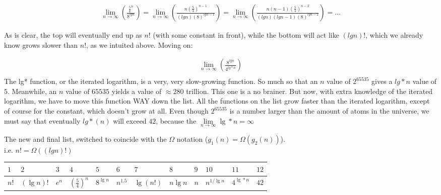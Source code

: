 \documentclass[12pt]{article}
\begin{document}
\begin{enumerate}
\begin{gather*}
	\lim\limits_{n\to\infty}\left(\frac{\frac{5}{4}^n}{8^{lgn}}\right) = \lim\limits_{n\to\infty}\left(\frac{n(\frac{5}{4})^{n-1}}{(lgn)(8)^{lgn-1}}\right) = \lim\limits_{n\to\infty}\left(\frac{n(n-1)(\frac{5}{4})^{n-2}}{(lgn)(lgn - 1)(8)^{lgn-2}}\right) = \dots
	\end{gather*}
	
	As is clear, the top will eventually end up as $n!$ (with some constant in front), while the bottom will act like $(lgn)!$, which we already know grows slower than $n!$, as we intuited above. Moving on:
	
	\begin{gather*}
		\lim\limits_{n\to\infty}\left(\frac{8^{lgn}}{4^{lg*n}}\right)\\
		\text{}
	\end{gather*}
The lg* function, or the iterated logarithm, is a very, very slow-growing function. So much so that an $n$ value of $2^{65535}$ gives a $lg*n$ value of $5$. Meanwhile, an $n$ value of $65535$ yields a value of $\approx 280$ trillion. This one is a no brainer. But now, with extra knowledge of the iterated logarithm, we have to move this function WAY down the list. All the functions on the list grow faster than the iterated logarithm, except of course for the constant, which doesn't grow at all. Even though $2^{65535}$ is a number larger than the amount of atoms in the universe, we must say that eventually $lg*(n)$ will exceed $42$, because the $\lim\limits_{n\to\infty}\lg*n = \infty$

The new and final list, switched to coincide with the $\Omega$ notation ($g_1(n) = \Omega(g_2(n))$).\\ i.e. $n! = \Omega((lgn)!)$

  \begin{tabular}{|l|l|l|l|l|l|l|l|l|l|l|l|}
	\hline
	$1$&
	$2$&
	$3$&
	$4$&
	$5$&
	$6$&
	$7$&
	$8$&
	$9$&
	$10$&
	$11$&
	$12$\\
	\hline
	$n!$ &
	$(\lg n)!$  &
	$e^n$  &
	$(\frac{5}{4})^n$ &
	$8^{\lg n}$  &
	$n^{1.5}$ &
	$\lg(n!)$ &
	$n \lg n$ &
	$n$ &
	$n^{1/ \lg n}$ &
	$4^{\lg* n}$ &
	$42$ \\
	\hline
\end{tabular}

\end{enumerate}
\end{document}
